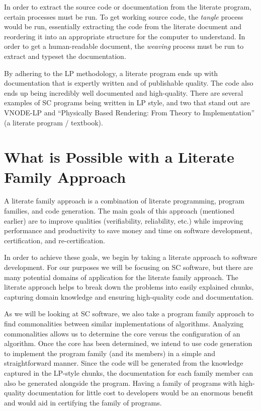 \documentclass[10pt, preprint]{sigplanconf}
\begin{document}
In order to extract the source code or documentation from the literate program, certain processes must be run. To get working source code, the \textit{tangle} process would be run, essentially extracting the code from the literate document and reordering it into an appropriate structure for the computer to understand. In order to get a human-readable document, the \textit{weaving} process must be run to extract and typeset the documentation. 

By adhering to the LP methodology, a literate program ends up with documentation that is expertly written and of publishable quality. The code also ends up being incredibly well documented and high-quality. There are several examples of SC programs being written in LP style, and two that stand out are VNODE-LP \cite{Nedialkov2006} and ``Physically Based Rendering: From Theory to Implementation'' \cite{PharrHumphreys2004} (a literate program / textbook). 

\section{What is Possible with a Literate Family Approach}
\label{sec:what}

A literate family approach is a combination of literate programming, program families, and code generation. The main goals of this approach (mentioned earlier) are to improve qualities (verifiability, reliability, etc.) while improving performance and productivity to save money and time on software development, certification, and re-certification.

In order to achieve these goals, we begin by taking a literate approach to software development. For our purposes we will be focusing on SC software, but there are many potential domains of application for the literate family approach. The literate approach helps to break down the problems into easily explained chunks, capturing domain knowledge and ensuring high-quality code and documentation.

As we will be looking at SC software, we also take a program family approach to find commonalities between similar implementations of algorithms. Analyzing commonalities allows us to determine the core versus the configuration of an algorithm. Once the core has been determined, we intend to use code generation to implement the program family (and its members) in a simple and straightforward manner. Since the code will be generated from the knowledge captured in the LP-style chunks, the documentation for each family member can also be generated alongside the program. Having a family of programs with high-quality documentation for little cost to developers would be an enormous benefit and would aid in certifying the family of programs.
\end{document}
